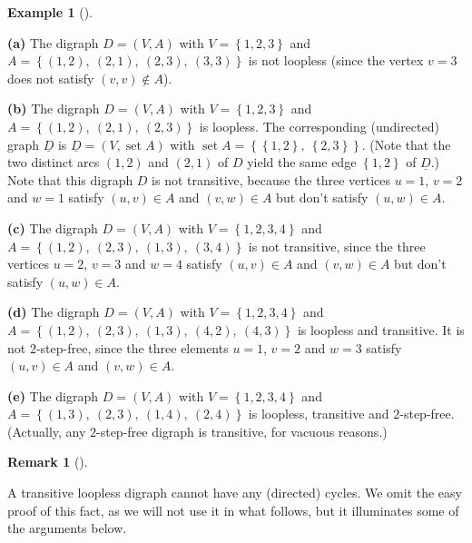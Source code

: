 \documentclass[numbers=enddot,12pt,final,onecolumn,notitlepage]{scrartcl}%
\theoremstyle{definition}
\newtheorem{remk}[theo]{Remark}
\newenvironment{remark}[1][]
{\begin{remk}[#1]\begin{leftbar}}
{\end{leftbar}\end{remk}}
\newtheorem{exmp}[theo]{Example}
\newenvironment{example}[1][]
{\begin{exmp}[#1]\begin{leftbar}}
{\end{leftbar}\end{exmp}}
\begin{document}
\begin{example}
\textbf{(a)} The digraph $D=\left(  V,A\right)  $ with $V=\left\{
1,2,3\right\}  $ and $A=\left\{  \left(  1,2\right)  ,\ \left(  2,1\right)
,\ \left(  2,3\right)  ,\ \left(  3,3\right)  \right\}  $ is not loopless
(since the vertex $v=3$ does not satisfy $\left(  v,v\right)  \notin A$).

\textbf{(b)} The digraph $D=\left(  V,A\right)  $ with $V=\left\{
1,2,3\right\}  $ and $A=\left\{  \left(  1,2\right)  ,\ \left(  2,1\right)
,\ \left(  2,3\right)  \right\}  $ is loopless. The corresponding (undirected)
graph $\underline{D}$ is $\underline{D}=\left(  V,\operatorname*{set}A\right)
$ with $\operatorname*{set}A=\left\{  \left\{  1,2\right\}  ,\ \left\{
2,3\right\}  \right\}  $. (Note that the two distinct arcs $\left(
1,2\right)  $ and $\left(  2,1\right)  $ of $D$ yield the same edge $\left\{
1,2\right\}  $ of $\underline{D}$.) Note that this digraph $D$ is not
transitive, because the three vertices $u=1$, $v=2$ and $w=1$ satisfy $\left(
u,v\right)  \in A$ and $\left(  v,w\right)  \in A$ but don't satisfy $\left(
u,w\right)  \in A$.

\textbf{(c)} The digraph $D=\left(  V,A\right)  $ with $V=\left\{
1,2,3,4\right\}  $ and $A=\left\{  \left(  1,2\right)  ,\ \left(  2,3\right)
,\ \left(  1,3\right)  ,\ \left(  3,4\right)  \right\}  $ is not transitive,
since the three vertices $u=2$, $v=3$ and $w=4$ satisfy $\left(  u,v\right)
\in A$ and $\left(  v,w\right)  \in A$ but don't satisfy $\left(  u,w\right)
\in A$.

\textbf{(d)} The digraph $D=\left(  V,A\right)  $ with $V=\left\{
1,2,3,4\right\}  $ and $A=\left\{  \left(  1,2\right)  ,\ \left(  2,3\right)
,\ \left(  1,3\right)  ,\ \left(  4,2\right)  ,\ \left(  4,3\right)  \right\}
$ is loopless and transitive. It is not $2$-step-free, since the three
elements $u=1$, $v=2$ and $w=3$ satisfy $\left(  u,v\right)  \in A$ and
$\left(  v,w\right)  \in A$.

\textbf{(e)} The digraph $D=\left(  V,A\right)  $ with $V=\left\{
1,2,3,4\right\}  $ and $A=\left\{  \left(  1,3\right)  ,\ \left(  2,3\right)
,\ \left(  1,4\right)  ,\ \left(  2,4\right)  \right\}  $ is loopless,
transitive and $2$-step-free. (Actually, any $2$-step-free digraph is
transitive, for vacuous reasons.)
\end{example}

\begin{remark}
A transitive loopless digraph cannot have any (directed) cycles. We omit the
easy proof of this fact, as we will not use it in what follows, but it
illuminates some of the arguments below.
\end{remark}
\end{document}
